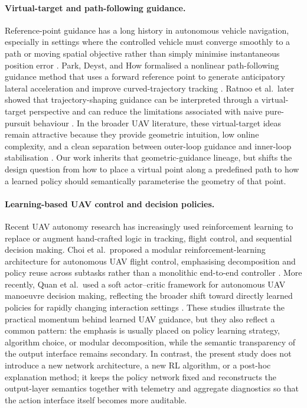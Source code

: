 \documentclass[drones,article,submit,pdftex,moreauthors]{Definitions/mdpi}
\begin{document}
\paragraph{Virtual-target and path-following guidance.}
Reference-point guidance has a long history in autonomous vehicle navigation, especially in settings where the controlled vehicle must converge smoothly to a path or moving spatial objective rather than simply minimise instantaneous position error \cite{sujit2014}. Park, Deyst, and How formalised a nonlinear path-following guidance method that uses a forward reference point to generate anticipatory lateral acceleration and improve curved-trajectory tracking \cite{park2007}. Ratnoo et al.\ later showed that trajectory-shaping guidance can be interpreted through a virtual-target perspective and can reduce the limitations associated with naive pure-pursuit behaviour \cite{ratnoo2015}. In the broader UAV literature, these virtual-target ideas remain attractive because they provide geometric intuition, low online complexity, and a clean separation between outer-loop guidance and inner-loop stabilisation \cite{elmokadem2021,rhee2010}. Our work inherits that geometric-guidance lineage, but shifts the design question from how to place a virtual point along a predefined path to how a learned policy should semantically parameterise the geometry of that point.

\paragraph{Learning-based UAV control and decision policies.}
Recent UAV autonomy research has increasingly used reinforcement learning to replace or augment hand-crafted logic in tracking, flight control, and sequential decision making. Choi et al.\ proposed a modular reinforcement-learning architecture for autonomous UAV flight control, emphasising decomposition and policy reuse across subtasks rather than a monolithic end-to-end controller \cite{choi2023,jing2024aerospace}. More recently, Quan et al.\ used a soft actor--critic framework for autonomous UAV manoeuvre decision making, reflecting the broader shift toward directly learned policies for rapidly changing interaction settings \cite{quan2026,haarnoja2018}. These studies illustrate the practical momentum behind learned UAV guidance, but they also reflect a common pattern: the emphasis is usually placed on policy learning strategy, algorithm choice, or modular decomposition, while the semantic transparency of the output interface remains secondary. In contrast, the present study does not introduce a new network architecture, a new RL algorithm, or a post-hoc explanation method; it keeps the policy network fixed and reconstructs the output-layer semantics together with telemetry and aggregate diagnostics so that the action interface itself becomes more auditable.
\end{document}
